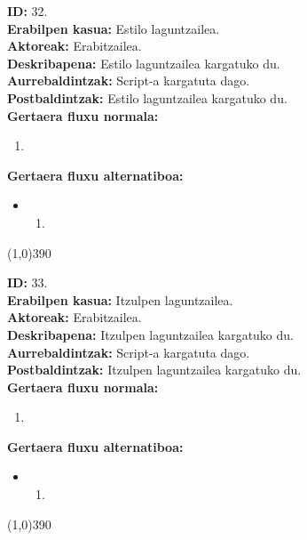 \noindent
\textbf{ID:} 32.\\
\textbf{Erabilpen kasua:} Estilo laguntzailea.\\
\textbf{Aktoreak:} Erabitzailea.\\
\textbf{Deskribapena:} Estilo laguntzailea kargatuko du.\\
\textbf{Aurrebaldintzak:} Script-a kargatuta dago.\\
\textbf{Postbaldintzak:} Estilo laguntzailea kargatuko du.\\
\textbf{Gertaera fluxu normala:}
\begin{enumerate}
	\item
\end{enumerate}
\textbf{Gertaera fluxu alternatiboa:}
\begin{itemize}
	\item 
		\begin{enumerate}
		\item
		\end{enumerate}
\end{itemize}
\line(1,0){390}

\noindent
\textbf{ID:} 33.\\
\textbf{Erabilpen kasua:} Itzulpen laguntzailea.\\
\textbf{Aktoreak:} Erabitzailea.\\
\textbf{Deskribapena:} Itzulpen laguntzailea kargatuko du.\\
\textbf{Aurrebaldintzak:} Script-a kargatuta dago.\\
\textbf{Postbaldintzak:} Itzulpen laguntzailea kargatuko du.\\
\textbf{Gertaera fluxu normala:}
\begin{enumerate}
	\item
\end{enumerate}
\textbf{Gertaera fluxu alternatiboa:}
\begin{itemize}
	\item 
		\begin{enumerate}
		\item
		\end{enumerate}
\end{itemize}
\line(1,0){390}

